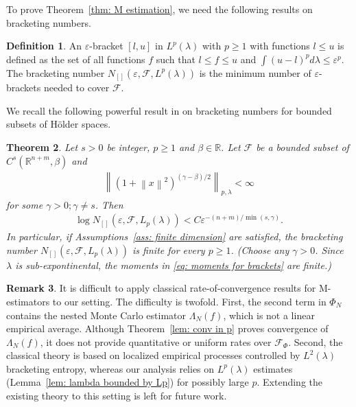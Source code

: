 \documentclass{amsart}
\newtheorem{theorem}{Theorem}[section]
\theoremstyle{definition}
\newtheorem{definition}[theorem]{Definition}
\newtheorem{remark}[theorem]{Remark}
\newcommand{\R}{{\mathbb R}}
\newcommand{\norm}[1]{\left\|#1\right\|}
\newcommand{\F}{\mathcal{F}}
\begin{document}
To prove Theorem~\ref{thm: M estimation}, we need the following results on bracketing numbers.
\begin{definition}
    An $\varepsilon$-bracket $[l, u]$ in $L^p(\lambda)$ with $p\ge 1$ with functions $l \le u$ is defined as the set of all functions $f$ such that $l \le f \le u$ and $\int (u-l)^p d \lambda \le \varepsilon^p$. 
    The bracketing number $N_{[]}(\varepsilon, \F, L^p(\lambda))$ is the minimum number of $\varepsilon$-brackets needed to cover $\F$.
\end{definition}
We recall the following powerful result in \cite[Corollary 3]{NicklBracketing2007} on bracketing numbers for bounded subsets of Hölder spaces.
\begin{theorem}\label{thm: bracketing number}
   Let $s >0$ be integer, $p\ge 1$ and $\beta \in \R$. Let $\F$ be a bounded subset of $C^s(\R^{n+m}, \beta)$ and 
   \begin{eqnarray}\label{eq: moments for brackets}
       \norm{(1+ \norm{x}^2)^{(\gamma - \beta)/2}}_{p, \lambda}  < \infty
   \end{eqnarray}
   for some $\gamma > 0; \gamma \neq s$.
    Then 
    \begin{eqnarray*}
        \log N_{[]}(\varepsilon, \F, L_{p}(\lambda)) < C \varepsilon^{-(n+m)/\min({s, \gamma})}. 
    \end{eqnarray*}
    In particular, if Assumptions~\ref{ass: finite dimension} are satisfied, the bracketing number $N_{[]}(\varepsilon, \F, L_{p}(\lambda))$ is finite for every $p \ge 1$. (Choose any $\gamma>0$. Since $\lambda$ is sub-expontinental, the moments in  \eqref{eq: moments for brackets} are finite.)
\end{theorem}







\begin{remark}
It is difficult to apply classical rate-of-convergence results for M-estimators
\cite{van1996weak} to our setting.
The difficulty is twofold. First, the second term in $\Phi_N$
contains the nested Monte Carlo estimator $\Lambda_N(f)$, which is
not a linear empirical average. Although
Theorem~\ref{lem: conv in p} proves convergence of $\Lambda_N(f)$,
it does not provide quantitative or uniform rates over
$\mathcal{F}_\Phi$. Second, the classical theory is based on
localized empirical processes controlled by $L^2(\lambda)$
bracketing entropy, whereas our analysis relies on
$L^p(\lambda)$ estimates (Lemma~\ref{lem: lambda bounded by Lp}) for
possibly large $p$. Extending the existing theory to this setting is
left for future work.
\end{remark}
\end{document}
